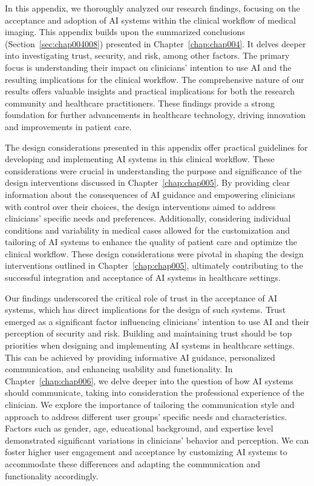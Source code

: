 In this appendix, we thoroughly analyzed our research findings, focusing on the acceptance and adoption of \ac{AI} systems within the clinical workflow of medical imaging.
This appendix builds upon the summarized conclusions (Section~\ref{sec:chap004008}) presented in Chapter~\ref{chap:chap004}.
It delves deeper into investigating trust, security, and risk, among other factors.
The primary focus is understanding their impact on clinicians' intention to use \ac{AI} and the resulting implications for the clinical workflow.
The comprehensive nature of our results offers valuable insights and practical implications for both the research community and healthcare practitioners.
These findings provide a strong foundation for further advancements in healthcare technology, driving innovation and improvements in patient care.

The design considerations presented in this appendix offer practical guidelines for developing and implementing \ac{AI} systems in this clinical workflow.
These considerations were crucial in understanding the purpose and significance of the design interventions discussed in Chapter~\ref{chap:chap005}.
By providing clear information about the consequences of \ac{AI} guidance and empowering clinicians with control over their choices, the design interventions aimed to address clinicians' specific needs and preferences.
Additionally, considering individual conditions and variability in medical cases allowed for the customization and tailoring of \ac{AI} systems to enhance the quality of patient care and optimize the clinical workflow.
These design considerations were pivotal in shaping the design interventions outlined in Chapter~\ref{chap:chap005}, ultimately contributing to the successful integration and acceptance of \ac{AI} systems in healthcare settings.

Our findings underscored the critical role of trust in the acceptance of \ac{AI} systems, which has direct implications for the design of such systems.
Trust emerged as a significant factor influencing clinicians' intention to use \ac{AI} and their perception of security and risk.
Building and maintaining trust should be top priorities when designing and implementing \ac{AI} systems in healthcare settings.
This can be achieved by providing informative \ac{AI} guidance, personalized communication, and enhancing usability and functionality.
In Chapter~\ref{chap:chap006}, we delve deeper into the question of how \ac{AI} systems should communicate, taking into consideration the professional experience of the clinician.
We explore the importance of tailoring the communication style and approach to address different user groups' specific needs and characteristics.
Factors such as gender, age, educational background, and expertise level demonstrated significant variations in clinicians' behavior and perception.
We can foster higher user engagement and acceptance by customizing \ac{AI} systems to accommodate these differences and adapting the communication and functionality accordingly.

